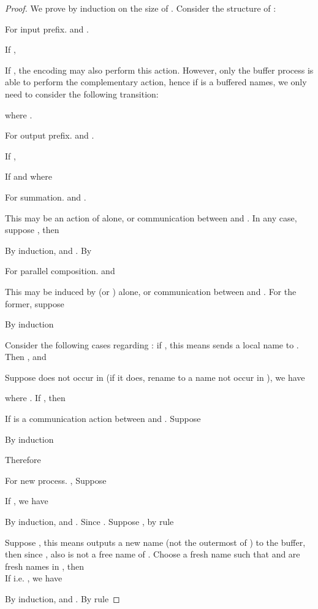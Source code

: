 \documentclass[runningheads, envcountsame, a4paper]{llncs}
\begin{document}
\begin{proof}
  We prove by induction on the size of . Consider the structure of :

  For input prefix.  and .
  
  If ,
  
  If , the encoding may also perform this action.
  However, only the buffer process  is able to perform the complementary  action,
  hence if  is a buffered names, we only need to consider the following transition:
  
  where .

  For output prefix.  and .
  
  If ,
  
  If  and  where 
  

  For summation.  and .
  
  This  may be an action of  alone, or communication between  and . In any case, suppose , then
  
  By induction,  and . By 
  

  For parallel composition.  and 
  
  This  may be induced by (or ) alone, or communication between  and . For the former, suppose
  
  By induction
  
  Consider the following cases regarding : if , this means  sends a local name  to  . Then ,  and
  
  Suppose  does not occur in  (if it does, rename  to a name not occur in ), we have
  
  
  where . If , then
  
  
  
  If  is a communication action between  and . Suppose
  
  By induction
  
  Therefore
  
  


  For new process. , Suppose 
  
  If , we have
  
  By induction,  and . Since . Suppose , by rule 
  
  
  Suppose , this means  outputs a new name  (not the outermost  of ) to the buffer, then  since , also  is not a free name of . Choose a fresh name  such that  and  are fresh names in , then  \\
  
  
  
  If  i.e. , we have
  
  By induction,  and . By rule 
  

\end{proof}
\end{document}
